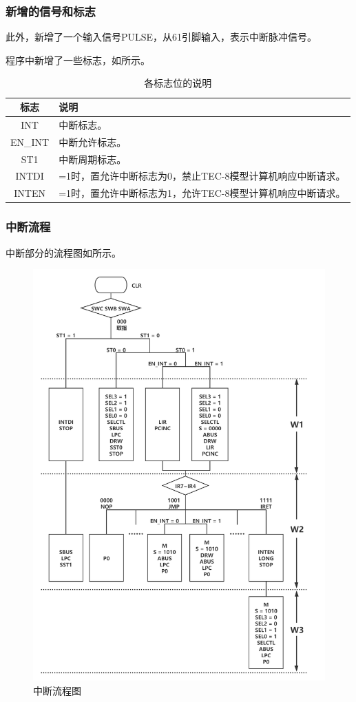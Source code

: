 \documentclass[lang=cn,11pt,a4paper,cite=authornum]{paper}
\begin{document}
\subsubsection{新增的信号和标志}

此外，新增了一个输入信号PULSE，从61引脚输入，表示中断脉冲信号。

程序中新增了一些标志，如所示。

\begin{table}[!htbp]
    \centering
    \caption{各标志位的说明\label{tab:signalexp}}
    \begin{tabular}{|c|l|}
        \hline
        标志 & 说明 \\ \hline
        INT & 中断标志。 \\ \hline
        EN\_INT & 中断允许标志。 \\ \hline
        ST1 & 中断周期标志。 \\ \hline
        INTDI & =1时，置允许中断标志为0，禁止TEC-8模型计算机响应中断请求。 \\ \hline
        INTEN & =1时，置允许中断标志为1，允许TEC-8模型计算机响应中断请求。 \\ \hline
    \end{tabular}
\end{table}

\subsubsection{中断流程}

中断部分的流程图如所示。

\begin{figure}[htbp]
    \centering
    \includegraphics[width=0.8\linewidth]{./Images/interrupt.png}
    \caption{中断流程图\label{fig:interrupt}}
\end{figure}
\end{document}
